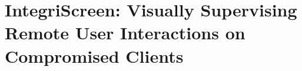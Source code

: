 


\chapter[IntegriScreen]{IntegriScreen: Visually Supervising Remote User Interactions on Compromised Clients}
\label{ch:integriscreen}







